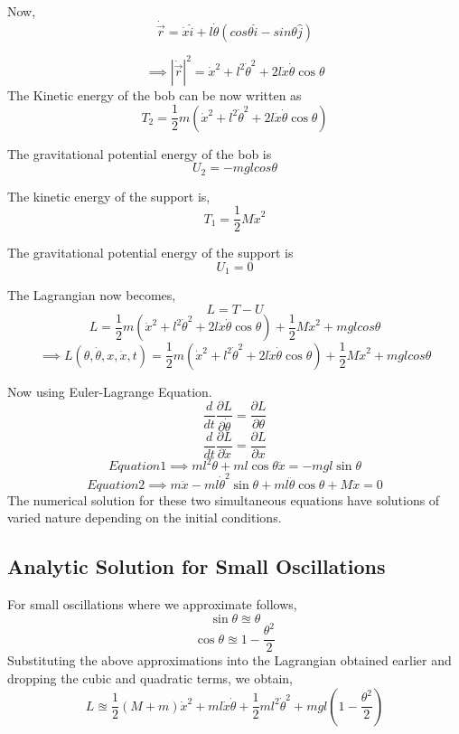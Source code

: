 \documentclass{article}
\begin{document}
	Now,
	\[ \dot{\vec{r}}  = \dot{x}\hat{i} + l\dot{\theta}( cos\theta \hat{i} - sin\theta\hat{j} ) \]
	
	\[ \implies |\dot{\vec{r}}|^2 = \dot{x}^2 + l^2 \dot{\theta}^2 + 2l\dot{x}\dot{\theta}\cos{\theta} \]	
	The Kinetic energy of the bob can be now written as 
	\[ 
	T_2 = \frac{1}{2}m(\dot{x}^2 + l^2 \dot{\theta}^2 + 2l\dot{x}\dot{\theta}\cos{\theta})
	\]
	
	The gravitational potential energy of the bob is
	\[ U_2 = -mglcos\theta \]
	
	The kinetic energy of the support is,
	\[
	T_1 = \frac{1}{2}M\dot{x}^2 
	\]
	
	The gravitational potential energy of the support is
	\[ U_1 = 0\]
	
	The Lagrangian now becomes,
	\[ L = T -U \]
	\[ L =  \frac{1}{2}m(\dot{x}^2 + l^2 \dot{\theta}^2 + 2l\dot{x}\dot{\theta}\cos{\theta}) +  \frac{1}{2}M\dot{x}^2 + mglcos\theta  \]
	\[ \implies L(\theta,\dot{\theta},x,\dot{x},t) =  \frac{1}{2}m(\dot{x}^2 + l^2 \dot{\theta}^2 + 2l\dot{x}\dot{\theta}\cos{\theta}) +  \frac{1}{2}M\dot{x}^2 + mglcos\theta \]
	
	Now using Euler-Lagrange Equation.
	\begin{equation*}
		\frac{d}{dt}\frac{\partial L } {\partial \dot{\theta} } = \frac{\partial L}{\partial \theta} \tag{1}
	\end{equation*}
	\begin{equation*}
		\frac{d}{dt}\frac{\partial L } {\partial \dot{x} } = \frac{\partial L}{\partial x} \tag{2}
	\end{equation*}
	\begin{equation*}
		Equation 1 \implies ml^2\ddot{\theta} + ml\cos{\theta}\ddot{x}= -mgl\sin\theta	\tag{a}
	\end{equation*}
\begin{equation*}
	Equation 2 \implies m\ddot{x} - ml\dot{\theta}^2\sin{\theta}+ ml\ddot{\theta} \cos\theta + M\ddot{x}	= 0 \tag{b}
\end{equation*}
	The numerical solution for these two simultaneous equations have solutions of varied nature depending on the initial conditions.
	\subsection{Analytic Solution for Small Oscillations}
	For small oscillations where we approximate  follows,
	 \[  \sin\theta \approxeq \theta\]
	 \[  \cos\theta \approxeq 1 - \frac{\theta^2}{2}\]
	 Substituting the above approximations into the Lagrangian obtained earlier and dropping the cubic and quadratic terms, we obtain,
	 \[ L \approxeq \frac{1}{2}(M+m)\dot{x}^2 + ml\dot{x}\dot{\theta} + \frac{1}{2}ml^2\dot{\theta}^2 + mgl(1-\frac{\theta^2}{2}) \]
	 
\end{document}
